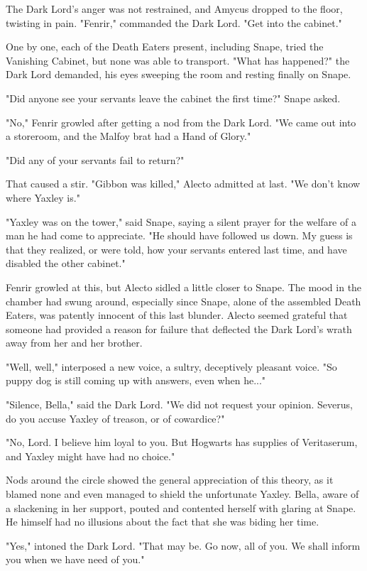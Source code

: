 \documentclass[a4paper,11pt]{article}
\begin{document}
The Dark Lord's anger was not restrained, and Amycus dropped to the floor, twisting in pain. "Fenrir," commanded the Dark Lord. "Get into the cabinet."

One by one, each of the Death Eaters present, including Snape, tried the Vanishing Cabinet, but none was able to transport. "What has happened?" the Dark Lord demanded, his eyes sweeping the room and resting finally on Snape.

"Did anyone see your servants leave the cabinet the first time?" Snape asked.

"No," Fenrir growled after getting a nod from the Dark Lord. "We came out into a storeroom, and the Malfoy brat had a Hand of Glory."

"Did any of your servants fail to return?"

That caused a stir. "Gibbon was killed," Alecto admitted at last. "We don't know where Yaxley is."

"Yaxley was on the tower," said Snape, saying a silent prayer for the welfare of a man he had come to appreciate. "He should have followed us down. My guess is that they realized, or were told, how your servants entered last time, and have disabled the other cabinet."

Fenrir growled at this, but Alecto sidled a little closer to Snape. The mood in the chamber had swung around, especially since Snape, alone of the assembled Death Eaters, was patently innocent of this last blunder. Alecto seemed grateful that someone had provided a reason for failure that deflected the Dark Lord's wrath away from her and her brother.

"Well, well," interposed a new voice, a sultry, deceptively pleasant voice. "So puppy dog is still coming up with answers, even when he..."

"Silence, Bella," said the Dark Lord. "We did not request your opinion. Severus, do you accuse Yaxley of treason, or of cowardice?"

"No, Lord. I believe him loyal to you. But Hogwarts has supplies of Veritaserum, and Yaxley might have had no choice."

Nods around the circle showed the general appreciation of this theory, as it blamed none and even managed to shield the unfortunate Yaxley. Bella, aware of a slackening in her support, pouted and contented herself with glaring at Snape. He himself had no illusions about the fact that she was biding her time.

"Yes," intoned the Dark Lord. "That may be. Go now, all of you. We shall inform you when we have need of you."
\end{document}

